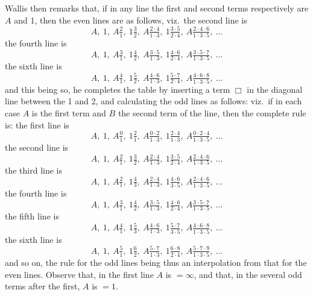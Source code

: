\documentclass[11pt,a4paper]{article}
\begin{document}
Wallis then remarks that, if in any line the first and second terms respectively are $A$ and 1, then the even lines are as follows, viz.\ the second line is
\[
A,\ 1,\ A\tfrac{2}{1},\ 1\tfrac{3}{2},\ A\tfrac{2 \cdot 4}{1 \cdot 3},\ 1\tfrac{3 \cdot 5}{2 \cdot 4},\ A\tfrac{2 \cdot 4 \cdot 6}{1 \cdot 3 \cdot 5},\ \ldots
\]
the fourth line is
\[
A,\ 1,\ A\tfrac{3}{1},\ 1\tfrac{4}{2},\ A\tfrac{3 \cdot 5}{1 \cdot 3},\ 1\tfrac{4 \cdot 6}{2 \cdot 4},\ A\tfrac{3 \cdot 5 \cdot 7}{1 \cdot 3 \cdot 5},\ \ldots
\]
the sixth line is
\[
A,\ 1,\ A\tfrac{4}{1},\ 1\tfrac{5}{2},\ A\tfrac{4 \cdot 6}{1 \cdot 3},\ 1\tfrac{5 \cdot 7}{2 \cdot 4},\ A\tfrac{4 \cdot 6 \cdot 8}{1 \cdot 3 \cdot 5},\ \ldots
\]
and this being so, he completes the table by inserting a term $\Box$ in the diagonal line between the 1 and 2, and calculating the odd lines as follows: viz.\ if in each case $A$ is the first term and $B$ the second term of the line, then the complete rule is:
the first line is
\[
A,\ 1,\ A\tfrac{0}{1},\ 1\tfrac{2}{1},\ A\tfrac{0 \cdot 2}{1 \cdot 3},\ 1\tfrac{2 \cdot 4}{1 \cdot 3},\ A\tfrac{0 \cdot 2 \cdot 4}{1 \cdot 3 \cdot 5},\ \ldots
\]
the second line is
\[
A,\ 1,\ A\tfrac{2}{1},\ 1\tfrac{3}{2},\ A\tfrac{2 \cdot 4}{1 \cdot 3},\ 1\tfrac{3 \cdot 5}{2 \cdot 4},\ A\tfrac{2 \cdot 4 \cdot 6}{1 \cdot 3 \cdot 5},\ \ldots
\]
the third line is
\[
A,\ 1,\ A\tfrac{2}{1},\ 1\tfrac{4}{3},\ A\tfrac{2 \cdot 4}{1 \cdot 3},\ 1\tfrac{4 \cdot 6}{3 \cdot 5},\ A\tfrac{2 \cdot 4 \cdot 6}{1 \cdot 3 \cdot 5},\ \ldots
\]
the fourth line is
\[
A,\ 1,\ A\tfrac{3}{1},\ 1\tfrac{4}{2},\ A\tfrac{3 \cdot 5}{1 \cdot 3},\ 1\tfrac{4 \cdot 6}{2 \cdot 4},\ A\tfrac{3 \cdot 5 \cdot 7}{1 \cdot 3 \cdot 5},\ \ldots
\]
the fifth line is
\[
A,\ 1,\ A\tfrac{4}{1},\ 1\tfrac{5}{3},\ A\tfrac{4 \cdot 6}{1 \cdot 3},\ 1\tfrac{5 \cdot 7}{3 \cdot 5},\ A\tfrac{4 \cdot 6 \cdot 8}{1 \cdot 3 \cdot 5},\ \ldots
\]
the sixth line is
\[
A,\ 1,\ A\tfrac{5}{1},\ 1\tfrac{6}{2},\ A\tfrac{5 \cdot 7}{1 \cdot 3},\ 1\tfrac{6 \cdot 8}{2 \cdot 4},\ A\tfrac{5 \cdot 7 \cdot 9}{1 \cdot 3 \cdot 5},\ \ldots
\]
and so on, the rule for the odd lines being thus an interpolation from that for the even lines. Observe that, in the first line $A$ is $= \infty$, and that, in the several odd terms after the first, $A$ is $= 1$.
\end{document}
